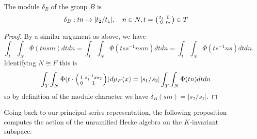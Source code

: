 \begin{prop}
    The module $\delta_B$ of the group $B$ is
    $$\delta_B : tn \mapsto |t_2/t_1|, \quad n \in N, t = \begin{psmallmatrix}
        t_1 & 0 \\ 0 & t_2
    \end{psmallmatrix} \in T$$
\end{prop}
\begin{proof}
    By a similar argument as above, we have
    $$\int_T\int_N \Phi(tnsm) dtdn = \int_T\int_N \Phi(tss^{-1}nsm)dtdn = \int_T\int_N \Phi(ts^{-1}ns) dt dn.$$ Identifying $N \cong F$ this is
    $$\int_T\int_N \Phi(t \cdot \begin{psmallmatrix}
        1 & s_1^{-1}xs_2 \\0&1 
    \end{psmallmatrix}) d\mu_F(x) = |s_1/s_2|\int_T\int_N\Phi(tn)dtdn$$
    so by definition of the module character we have $\delta_B(sm) = |s_2/s_1|$.
\end{proof}

Going back to our principal series representation, the following proposition computes the action of the unramified Hecke algebra on the $K$-invariant subspace:

